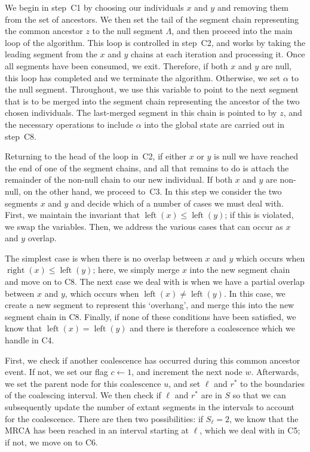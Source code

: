 \documentclass[10pt,letterpaper]{article}
\newcommand{\algref}[1]{#1}
\DeclareMathOperator{\segright}{right}
\DeclareMathOperator{\segleft}{left}
\begin{document}
We begin in step~\algref{C1} by choosing our individuals $x$ and $y$ and
removing them from the set of ancestors. We then set the tail of the
segment chain representing the common ancestor $z$ to the
null segment $\Lambda$, and then proceed into the main loop of the algorithm.
This loop is controlled in step~\algref{C2}, and works by taking the leading
segment from the $x$ and $y$ chains at each iteration and processing it. Once
all segments have been consumed, we exit. Therefore, if both $x$ and $y$
are null, this loop has completed and we terminate the algorithm. Otherwise, we
set $\alpha$ to the null segment. Throughout, we use this variable to point to
the next segment that is to be merged into the segment chain representing the
ancestor of the two chosen individuals. The last-merged segment in this chain
is pointed to by $z$, and the necessary operations to include $\alpha$ into
the global state are carried out in step~\algref{C8}.

Returning to the head of the loop in~\algref{C2}, if either $x$ or $y$
is null we have reached the end of one of the segment chains, and all that
remains to do is attach the remainder of the non-null chain to our new
individual. If both $x$ and $y$ are non-null, on the other hand,
we proceed to~\algref{C3}. In this step we consider the two segments $x$
and $y$ and decide which of a number of cases we must deal with.
First, we maintain the invariant that $\segleft(x) \leq
\segleft(y)$; if this is violated, we swap the variables. Then, we address the
various cases that can occur as $x$ and $y$ overlap.

The simplest case is when there is no overlap between $x$ and $y$ which
occurs when $\segright(x) \leq \segleft(y)$; here, we simply merge $x$
into the new segment chain and move on to \algref{C8}. The next case
we deal with is when we have a partial overlap between $x$ and $y$,
which occurs when $\segleft(x) \neq \segleft(y)$. In this case, we create
a new segment to represent this `overhang', and merge this into the
new segment chain in \algref{C8}. Finally, if none of these conditions
have been satisfied, we know that $\segleft(x) = \segleft(y)$ and
there is therefore a coalescence which we handle in \algref{C4}.

First, we check if another coalescence has occurred during this
common ancestor event. If not, we set our flag $c \leftarrow 1$,
and increment the next node $w$. Afterwards, we set the parent node
for this coalescence $u$, and set $\ell$ and $r^\ast$ to the
boundaries of the coalescing interval. We then check if $\ell$
and $r^\ast$ are in $S$ so that we can subsequently update the
number of extant segments in the intervals to account for the coalescence.
There are then two possibilities: if $S_\ell = 2$, we know that the MRCA
has been reached in an interval starting at $\ell$, which we deal with
in \algref{C5}; if not, we move on to \algref{C6}.
\end{document}
